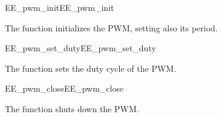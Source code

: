 \begin{function_nopb2}{EE\_pwm\_init}{EE_pwm_init}
  
  \begin{fundescription}
    The function initializes the PWM, setting also its period.
  \end{fundescription}
  
\begin{funparameters}
\end{funparameters}
  
  
\end{function_nopb2}


\begin{function_nopb2}{EE\_pwm\_set\_duty}{EE_pwm_set_duty}
  
  \begin{fundescription}
    The function sets the duty cycle of the PWM.
  \end{fundescription}
  
\begin{funparameters}
\end{funparameters}
  
  
\end{function_nopb2}

\begin{function_nopb2}{EE\_pwm\_close}{EE_pwm_close}
  
  \begin{fundescription}
    The function shuts down the PWM.
  \end{fundescription}
\end{function_nopb2}



